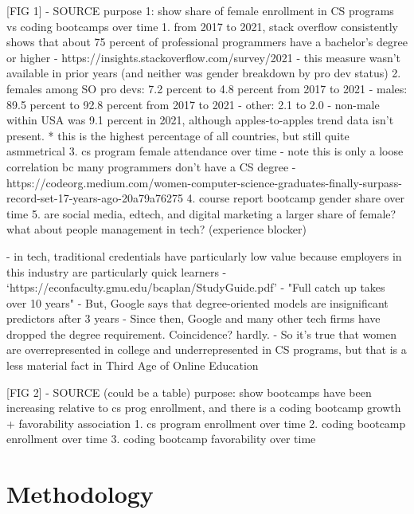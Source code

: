 \documentclass[review]{elsarticle}
\begin{document}


[FIG 1] - SOURCE
purpose 1: show share of female enrollment in CS programs vs coding bootcamps over time
1. from 2017 to 2021, stack overflow consistently shows that about 75 percent of professional programmers have a bachelor's degree or higher
  - https://insights.stackoverflow.com/survey/2021
  - this measure wasn't available in prior years (and neither was gender breakdown by pro dev status)
2. females among SO pro devs: 7.2 percent to 4.8 percent from 2017 to 2021
  - males: 89.5 percent to 92.8 percent from 2017 to 2021
  - other: 2.1 to 2.0
  - non-male within USA was 9.1 percent in 2021, although apples-to-apples trend data isn't present.
      * this is the highest percentage of all countries, but still quite asmmetrical
3. cs program female attendance over time
  - note this is only a loose correlation bc many programmers don't have a CS degree
  - https://codeorg.medium.com/women-computer-science-graduates-finally-surpass-record-set-17-years-ago-20a79a76275
4. course report bootcamp gender share over time
5. are social media, edtech, and digital marketing a larger share of female? what about people management in tech? (experience blocker)

- in tech, traditional credentials have particularly low value because employers in this industry are particularly quick learners
   - `https://econfaculty.gmu.edu/bcaplan/StudyGuide.pdf'
   - "Full catch up takes over 10 years"
   - But, Google says that degree-oriented models are insignificant predictors after 3 years
   - Since then, Google and many other tech firms have dropped the degree requirement. Coincidence? hardly.
   - So it's true that women are overrepresented in college and underrepresented in CS programs, but that is a less material fact in Third Age of Online Education

[FIG 2] - SOURCE (could be a table)
purpose: show bootcamps have been increasing relative to cs prog enrollment, and there is a coding bootcamp growth + favorability association
1. cs program enrollment over time
2. coding bootcamp enrollment over time
3. coding bootcamp favorability over time


\section{Methodology}
\end{document}
